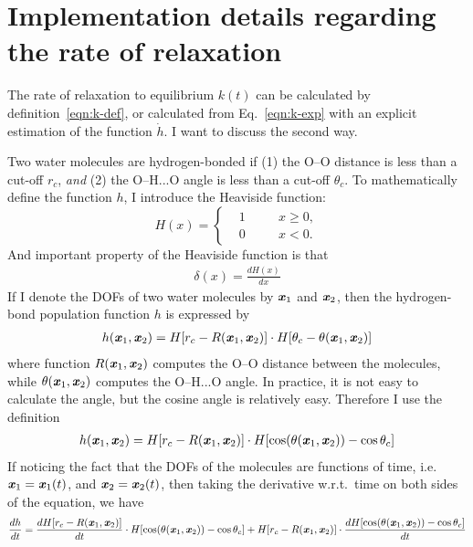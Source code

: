 \documentclass[unsortedaddress,a4paper,onecolumn]{revtex4}
\newcommand{\vect}[1]{\textbf{\textit{#1}}}
\begin{document}
\section{Implementation details regarding the rate of relaxation}

The rate of relaxation to equilibrium $k(t)$ can be calculated by
definition~\eqref{eqn:k-def}, or calculated from Eq.~\eqref{eqn:k-exp}
with an explicit estimation of the function $\dot h$. I want to discuss the second way.

Two water molecules are hydrogen-bonded if (1) the O--O distance is less than a cut-off $r_c$, \emph{and} (2)
the O--H...O angle is less than a cut-off $\theta_c$. To mathematically define the function $h$, I introduce
the Heaviside function:
\begin{equation}\label{eqn:heavi}
  H(x) =
  \left\{
    \begin{alignedat}{3}
      &1 &\quad& x\geq0, \\
      &0 &     & x < 0.
    \end{alignedat}
  \right.
\end{equation}
And important property of the Heaviside function is that
\begin{align}
  \delta (x) = \frac{dH(x)}{dx}
\end{align}
If I denote the DOFs of two water molecules by $\vect x_1$ and $\vect x_2$, then the hydrogen-bond population function $h$ is expressed by
\begin{align}
  h(\vect x_1, \vect x_2) = H [r_c - R(\vect x_1, \vect x_2)] \cdot H [\theta_c - \theta(\vect x_1, \vect x_2)]
\end{align}
where function $R(\vect x_1, \vect x_2)$ computes the O--O distance
between the molecules, while $\theta(\vect x_1, \vect x_2)$ computes
the O--H...O angle. In practice, it is not easy to calculate the
angle, but the cosine angle is relatively easy. Therefore I use the
definition 
\begin{align}
  h(\vect x_1, \vect x_2) = H [r_c - R(\vect x_1, \vect x_2)] \cdot H[\cos(\theta(\vect x_1, \vect x_2)) - \cos \theta_c]
\end{align}
If noticing the fact that the DOFs of the molecules are functions of
time, i.e.~$\vect x_1 = \vect x_1(t)$, and $\vect x_2 = \vect x_2(t)$, then
taking the derivative w.r.t.~time on both sides of the equation, we have
\begin{align}
  \frac{d h}{dt}
  =
  \frac{dH [r_c - R(\vect x_1, \vect x_2)]}{dt} \cdot H[\cos(\theta(\vect x_1, \vect x_2)) - \cos \theta_c] +
  H [r_c - R(\vect x_1, \vect x_2)] \cdot \frac{dH[\cos(\theta(\vect x_1, \vect x_2)) - \cos \theta_c]}{dt}
\end{align}
\end{document}
